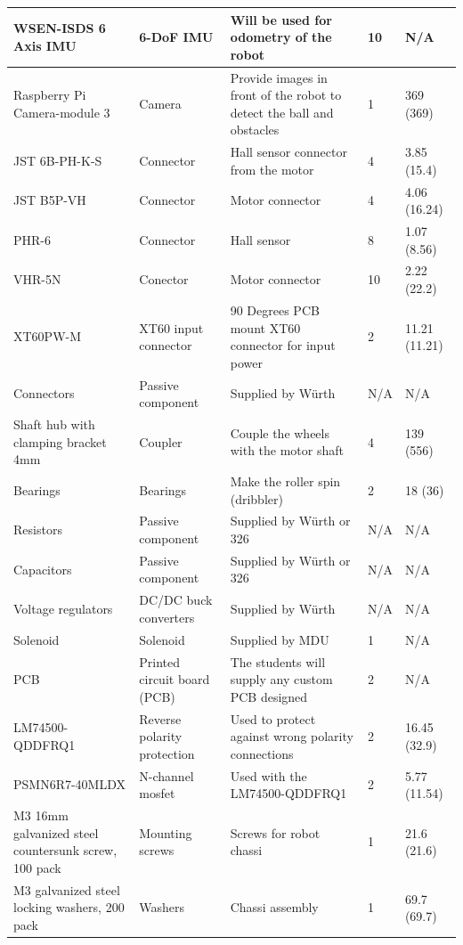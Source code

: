 \begin{center}
\begin{longtable}{|p{3cm}|p{3cm}|p{3cm}|p{1cm}|p{3cm}| }
        WSEN-ISDS 6 Axis IMU & 6-DoF IMU & Will be used for odometry of the robot & 10 & N/A\\ \hline 
        Raspberry Pi Camera-module 3 & Camera & Provide images in front of the robot to detect the ball and obstacles & 1 & 369 (369) \\ \hline 
        JST 6B-PH-K-S & Connector & Hall sensor connector from the motor & 4 & 3.85 (15.4) \\ \hline 
        JST B5P-VH & Connector & Motor connector & 4 & 4.06 (16.24) \\ \hline 
        PHR-6 & Connector & Hall sensor & 8 & 1.07 (8.56)\\ \hline
        VHR-5N & Conector & Motor connector & 10 & 2.22 (22.2)\\ \hline
        XT60PW-M & XT60 input connector & 90 Degrees PCB mount XT60 connector for input power & 2 & 11.21 (11.21)\\ \hline
        Connectors & Passive component & Supplied by Würth & N/A & N/A \\ \hline 
        Shaft hub with clamping bracket 4mm & Coupler & Couple the wheels with the motor shaft & 4 & 139 (556) \\ \hline 
        Bearings & Bearings & Make the roller spin (dribbler) & 2 & 18 (36)\\ \hline 
        Resistors & Passive component & Supplied by Würth or 326 & N/A & N/A \\ \hline 
        Capacitors & Passive component & Supplied by Würth or 326 & N/A & N/A \\ \hline 
        Voltage regulators & DC/DC buck converters & Supplied by Würth & N/A & N/A \\ \hline 
        Solenoid & Solenoid & Supplied by MDU & 1 & N/A \\ \hline 
        PCB & Printed circuit board (PCB) & The students will supply any custom PCB designed & 2 & N/A\\ \hline
        LM74500\break-QDDFRQ1 & Reverse polarity protection & Used to
        protect against wrong polarity connections & 2 & 16.45 (32.9) \\ \hline 
        PSMN6R7-40MLDX & N-channel mosfet & Used with the LM74500\break-QDDFRQ1 & 2 & 5.77 (11.54) \\ \hline 
        M3 16mm galvanized steel countersunk screw, 100 pack & Mounting screws & Screws for robot chassi & 1 & 21.6 (21.6) \\ \hline
        M3 galvanized steel locking washers, 200 pack & Washers & Chassi assembly & 1 & 69.7 (69.7) \\ \hline

\end{longtable}
\end{center}
